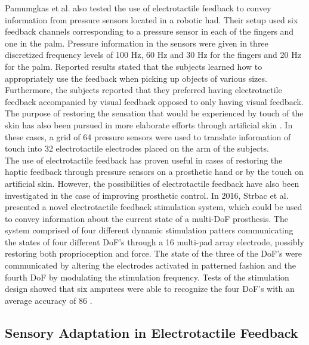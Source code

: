 Pamumgkas et al. \cite{Pamungkas2015} also tested the use of electrotactile feedback to convey information from pressure sensors located in a robotic had. Their setup used six feedback channels corresponding to a pressure sensor in each of the fingers and one in the palm. Pressure information in the sensors were given in three discretized frequency levels of 100 Hz, 60 Hz and 30 Hz for the fingers and 20 Hz for the palm. Reported results stated that the subjects learned how to appropriately use the feedback when picking up objects of various sizes. Furthermore, the subjects reported that they preferred having electrotactile feedback accompanied by visual feedback opposed to only having visual feedback. \cite{Pamungkas2015} 
The purpose of restoring the sensation that would be experienced by touch of the skin has also been pursued in more elaborate efforts through artificial skin \cite{Hartmann2014,Franceschi2015}. In these cases, a grid of 64 pressure sensors were used to translate information of touch into 32 electrotactile electrodes placed on the arm of the subjects. \\
The use of electrotactile feedback has proven useful in cases of restoring the haptic feedback through pressure sensors on a prosthetic hand or by the touch on artificial skin. However, the possibilities of electrotactile feedback have also been investigated in the case of improving prosthetic control. In 2016, Strbac et al. \cite{Strbac2016} presented a novel electrotactile feedback stimulation system, which could be used to convey information about the current state of a multi-DoF prosthesis. The system comprised of four different dynamic stimulation patters communicating the states of four different DoF's through a 16 multi-pad array electrode, possibly restoring both proprioception and force. The state of the three of the DoF's were communicated by altering the electrodes activated in patterned fashion and the fourth DoF by modulating the stimulation frequency. Tests of the stimulation design showed that six amputees were able to recognize the four DoF's with an average accuracy of 86 \percent. \cite{Strbac2016}   

\subsection{Sensory Adaptation in Electrotactile Feedback}

